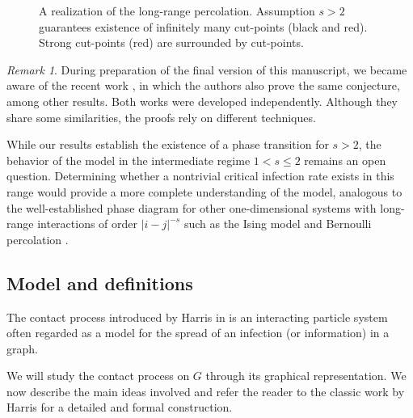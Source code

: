 \documentclass[a4paper,oneside,12pt]{amsart}
\renewcommand{\leq}{\leqslant}
\theoremstyle{plain}
\theoremstyle{definition}
\theoremstyle{remark}
\newtheorem{remark}{Remark}
\begin{document}
\begin{center}
\begin{figure}
\caption{A realization of the long-range percolation. 
Assumption $s>2$ guarantees existence of infinitely many cut-points (black and red). Strong cut-points (red) are surrounded by cut-points.}
\label{f:long_range}
\end{figure}
\end{center}

\begin{remark}
During preparation of the final version of this manuscript, we became aware of the recent work \cite{Jahnel25}, in which the authors also prove the same conjecture, among other results.  
Both works were developed independently. Although they share some similarities, the proofs rely on different techniques.  
\end{remark}

While our results establish the existence of a phase transition for \( s > 2 \), the behavior of the model in the intermediate regime \( 1 < s \leq 2 \) remains an open question. 
Determining whether a nontrivial critical infection rate exists in this range would provide a more complete understanding of the model, analogous to the well-established phase diagram for other one-dimensional systems with long-range interactions of order \( |i - j|^{-s} \) such as the Ising model \cite{Dyson69, Frolich84}  and Bernoulli percolation \cite{Newman86, Aizenman86}.

\subsection{Model and definitions}

The contact process introduced by Harris in \cite{Harris74} is an interacting particle system often regarded as a model for the spread of an infection (or information) in a graph.

We will study the contact process on $G$ through its graphical representation.
We now describe the main ideas involved and refer the reader to the classic work by Harris \cite{Harris78} for a detailed and formal construction.
\end{document}
